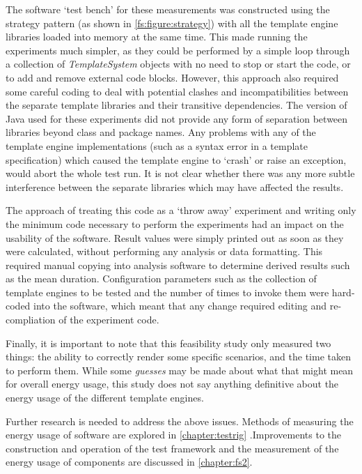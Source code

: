 The software `test bench' for these measurements was constructed using the strategy pattern (as shown in \autoref{fs:figure:strategy}) with all the template engine libraries loaded into memory at the same time. This made running the experiments much simpler, as they could be performed by a simple loop through a collection of \emph{TemplateSystem} objects with no need to stop or start the code, or to add and remove external code blocks. However, this approach also required some careful coding to deal with potential clashes and incompatibilities between the separate template libraries and their transitive dependencies. The version of Java used for these experiments did not provide any form of separation between libraries beyond class and package names. Any problems with any of the template engine implementations (such as a syntax error in a template specification) which caused the template engine to `crash' or raise an exception, would abort the whole test run. It is not clear whether there was any more subtle interference between the separate libraries which may have affected the results.

The approach of treating this code as a `throw away' experiment and writing only the minimum code necessary to perform the experiments had an impact on the usability of the software. Result values were simply printed out as soon as they were calculated, without performing any analysis or data formatting. This required manual copying into analysis software to determine derived results such as the mean duration. Configuration parameters such as the collection of template engines to be tested and the number of times to invoke them were hard-coded into the software, which meant that any change required editing and re-compliation of the experiment code.

Finally, it is important to note that this feasibility study only measured two things: the ability to correctly render some specific scenarios, and the time taken to perform them. While some \emph{guesses} may be made about what that might mean for overall energy usage, this study does not say anything definitive about the energy usage of the different template engines.

Further research is needed to address the above issues. Methods of measuring the energy usage of software are explored in \autoref{chapter:testrig} .Improvements to the construction and operation of the test framework and the measurement of the energy usage of components are discussed in \autoref{chapter:fs2}.

